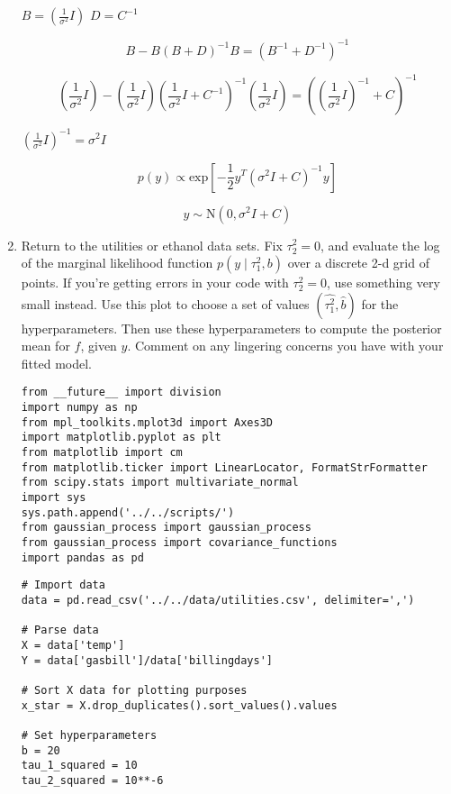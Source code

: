 \documentclass[10pt]{article}
\begin{document}
\begin{enumerate}[label=(\Alph*)]
            $B = \left(\frac{1}{\sigma^2}I \right)$ $D = C^{-1}$

            $$B - B(B+D)^{-1} B = \left(B^{-1} + D^{-1} \right)^{-1}$$

            $$\left(\frac{1}{\sigma^2} I \right) - \left(\frac{1}{\sigma^2} I \right) \left(\frac{1}{\sigma^2} I + C^{-1} \right)^{-1} \left(\frac{1}{\sigma^2} I \right) = \left( \left(\frac{1}{\sigma^2} I\right)^{-1} + C \right)^{-1}$$

            $ \left(\frac{1}{\sigma^2} I\right)^{-1} = \sigma^2 I $

            $$p(y) \propto \text{exp} \left[-\frac{1}{2} y^T \left(\sigma^2 I + C \right)^{-1} y \right]$$

            $$y \sim \text{N} \left(0, \sigma^2 I + C \right)$$

            \item Return to the utilities or ethanol data sets. Fix $\tau^2_2 = 0$, and evaluate the log of the marginal likelihood function $p(y \mid \tau^2_1, b)$ over a discrete 2-d grid of points. If you're getting errors in your code with $\tau^2_2 = 0$, use something very small instead.  Use this plot to choose a set of values $(\hat{\tau^2_1}, \hat{b})$ for the hyperparameters.  Then use these hyperparameters to compute the posterior mean for $f$, given $y$.  Comment on any lingering concerns you have with your fitted model.

        \begin{lstlisting}
from __future__ import division
import numpy as np 
from mpl_toolkits.mplot3d import Axes3D
import matplotlib.pyplot as plt
from matplotlib import cm
from matplotlib.ticker import LinearLocator, FormatStrFormatter
from scipy.stats import multivariate_normal
import sys
sys.path.append('../../scripts/')
from gaussian_process import gaussian_process
from gaussian_process import covariance_functions
import pandas as pd
        \end{lstlisting}

        \begin{lstlisting}
# Import data
data = pd.read_csv('../../data/utilities.csv', delimiter=',')

# Parse data
X = data['temp']
Y = data['gasbill']/data['billingdays']

# Sort X data for plotting purposes
x_star = X.drop_duplicates().sort_values().values

# Set hyperparameters
b = 20
tau_1_squared = 10
tau_2_squared = 10**-6


\end{lstlisting}
\end{enumerate}
\end{document}
